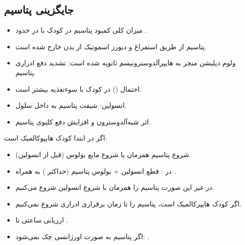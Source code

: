 \documentclass[12pt,a4paper]{article}
\begin{document}
\subsection*{جایگزینی پتاسیم}
\begin{itemize}
\item میزان کلی کمبود پتاسیم در کودک با  در حدود .
\item پتاسیم از طریق استفراغ و دیورز اسموتیک از بدن خارج شده است.
\item ولوم دپلیشن منجر به هایپرآلدوسترونیسم ثانویه شده است: تشدید دفع ادراری پتاسیم.
\item احتمال  () در کودک با سوءتغذیه بیشتر است.
\item انسولین: شیفت پتاسیم به داخل سلول.
\item اثر شبه‌آلدوسترون و افزایش دفع کلیوی پتاسیم.
\end{itemize}
اگر در ابتدا کودک هایپوکالمیک است:
\begin{itemize}
\item شروع پتاسیم همزمان با شروع مایع بولوس (قبل از انسولین).
\item در : قطع انسولین + بولوس پتاسیم (حداکثر ) به همراه .
\item در غیر این صورت پتاسیم را همزمان با شروع انسولین شروع می‌کنیم.
\end{itemize}

\begin{itemize}
\item اگر کودک هایپرکالمیک است، پتاسیم را تا زمان برقراری  ادراری شروع نمی‌کنیم.
\item ارزیابی ساعتی تا .
\item اگر پتاسیم به صورت اورژانسی چک نمی‌شود: .
\end{itemize}
\end{document}
